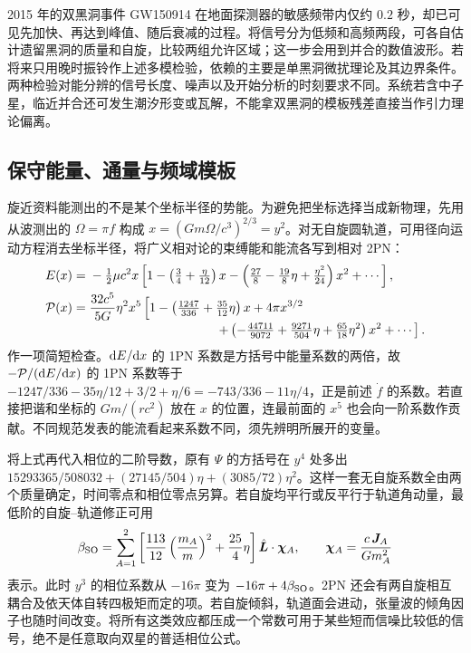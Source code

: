 2015 年的双黑洞事件 GW150914 在地面探测器的敏感频带内仅约 $0.2$ 秒，却已可见先加快、再达到峰值、随后衰减的过程。将信号分为低频和高频两段，可各自估计遗留黑洞的质量和自旋，比较两组允许区域；这一步会用到并合的数值波形。若将来只用晚时振铃作上述多模检验，依赖的主要是单黑洞微扰理论及其边界条件。两种检验对能分辨的信号长度、噪声以及开始分析的时刻要求不同。系统若含中子星，临近并合还可发生潮汐形变或瓦解，不能拿双黑洞的模板残差直接当作引力理论偏离。

\subsection{保守能量、通量与频域模板}\label{sec:pn-wave-energy}

旋近资料能测出的不是某个坐标半径的势能。为避免把坐标选择当成新物理，先用从波测出的 $\Omega=\pi f$ 构成 $x=(Gm\Omega/c^3)^{2/3}=y^2$。对无自旋圆轨道，可用径向运动方程消去坐标半径，将广义相对论的束缚能和能流各写到相对 2PN：
\begin{align*}
 E(x)={}&-\tfrac12\mu c^2 x
 \left[1-\left(\tfrac34+\tfrac{\eta}{12}\right)x
 -\left(\tfrac{27}{8}-\tfrac{19}{8}\eta+\tfrac{\eta^2}{24}\right)x^2+\cdots\right],\\
 {\cal P}(x)={}&\frac{32c^5}{5G}\eta^2 x^5
 \left[1-\left(\tfrac{1247}{336}+\tfrac{35}{12}\eta\right)x
      +4\pi x^{3/2}\right.\\[-2pt]
 &\hspace{35mm}\left.
      +\left(-\tfrac{44711}{9072}+\tfrac{9271}{504}\eta
               +\tfrac{65}{18}\eta^2\right)x^2+\cdots\right].
\end{align*}
作一项简短检查。$\dd E/\dd x$ 的 1PN 系数是方括号中能量系数的两倍，故 $-\mathcal P/(\dd E/\dd x)$ 的 1PN 系数等于 $-1247/336-35\eta/12+3/2+\eta/6=-743/336-11\eta/4$，正是前述 $\dot f$ 的系数。若直接把谐和坐标的 $Gm/(rc^2)$ 放在 $x$ 的位置，连最前面的 $x^5$ 也会向一阶系数作贡献。不同规范发表的能流看起来系数不同，须先辨明所展开的变量。

将上式再代入相位的二阶导数，原有 $\Psi$ 的方括号在 $y^4$ 处多出 $15293365/508032+(27145/504)\eta+(3085/72)\eta^2$。这样一套无自旋系数全由两个质量确定，时间零点和相位零点另算。若自旋均平行或反平行于轨道角动量，最低阶的自旋--轨道修正可用
\[
 \beta_{\rm SO}=\sum_{A=1}^2
 \left[\frac{113}{12}\left(\frac{m_A}{m}\right)^2
          +\frac{25}{4}\eta\right]\hat{\bm L}\cdot\bm\chi_A,
 \qquad \bm\chi_A=\frac{c\,\bm J_A}{Gm_A^2}
\]
表示。此时 $y^3$ 的相位系数从 $-16\pi$ 变为 $-16\pi+4\beta_{\rm SO}$。2PN 还会有两自旋相互耦合及依天体自转四极矩而定的项。若自旋倾斜，轨道面会进动，张量波的倾角因子也随时间改变。将所有这类效应都压成一个常数可用于某些短而信噪比较低的信号，绝不是任意取向双星的普适相位公式。

